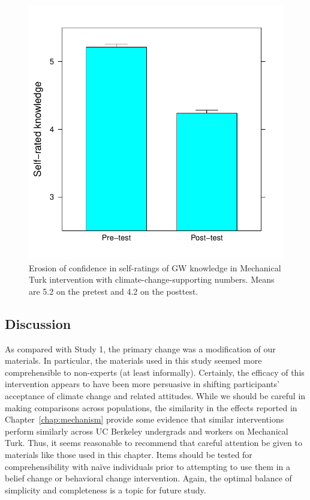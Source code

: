 \begin{figure}
    \centering
    \includegraphics{CCO-prondi-knw.pdf}
    \caption{Erosion of confidence in self-ratings of GW knowledge in Mechanical
        Turk intervention with climate-change-supporting numbers. Means are 5.2
    on the pretest and 4.2 on the posttest.}
    \label{fig:prondi-knw}
\end{figure}

% 

\subsection{Discussion}

As compared with Study 1, the primary change was a modification of our
materials. In particular, the materials used in this study seemed more
comprehensible to non-experts (at least informally). Certainly, the efficacy of
this intervention appears to have been more persuasive in shifting participants'
acceptance of climate change and related attitudes. While we should be careful
in making comparisons across populations, the similarity in the effects reported
in Chapter~\ref{chap:mechanism} provide some evidence that similar interventions
perform similarly across UC Berkeley undergrads and workers on Mechanical Turk.
Thus, it seems reasonable to recommend that careful attention be given to
materials like those used in this chapter. Items should be tested for
comprehensibility with naïve individuals prior to attempting to use them in a
belief change or behavioral change intervention. Again, the optimal balance of
simplicity and completeness is a topic for future study.


